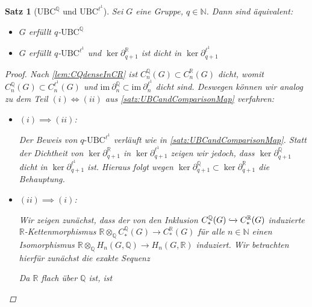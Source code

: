 \documentclass[a4paper,twoside,10pt]{scrreprt}
\newcommand {\img}{\text{im}~}
\newcommand{\N}{\mathbb{N}}
\newcommand{\Q}{\mathbb{Q}}
\newcommand{\R}{\mathbb{R}}
\newtheorem{satz}{Satz}[section]
\theoremstyle{definition}
\begin{document}
\begin{satz}[$\text{UBC}^{\Q}$ und $\text{UBC}^{\ell^1}$]\label{satz:QUBCandComparisonMap}
Sei $G$ eine Gruppe, $q\in \N$. Dann sind äquivalent:
\renewcommand{\labelenumi}{(\roman{enumi}) }
\begin{itemize}
\item $G$ erfüllt $q$-$\text{UBC}^{\Q}$
\item $G$ erfüllt $q$-$\text{UBC}^{\ell^1}$ und $\ker \partial_{q+1}^{\R}$ ist dicht in $\ker \partial_{q+1}^{\ell^1}$
\end{itemize}
\begin{proof}
Nach \cref{lem:CQdenseInCR} ist $C_n^{\Q}(G)\subset C_n^{\R}(G)$ dicht, womit $C_n^{\Q}(G)\subset C_n^{\ell^1}(G)$ und $\img\partial_n^{\Q}\subset \img\partial_n^{\ell^1}$ dicht sind.
Deswegen können wir analog zu dem Teil $(i)\Longleftrightarrow(ii)$ aus \cref{satz:UBCandComparisonMap} verfahren:
\begin{itemize}
\item $(i)\implies (ii)$:\par
Der Beweis von $q\text{-UBC}^{\ell^1}$ verläuft wie in \cref{satz:UBCandComparisonMap}. Statt der Dichtheit von $\ker \partial_{q+1}^{\R}$ in $\ker \partial_{q+1}^{\ell^1}$ zeigen wir jedoch, dass $\ker \partial_{q+1}^{\Q}$ dicht in $\ker \partial_{q+1}^{\ell^1}$ ist. Hieraus folgt wegen $\ker \partial_{q+1}^{\Q}\subset \ker \partial_{q+1}^{\R}$ die Behauptung.
\item $(ii)\implies(i)$:\par
Wir zeigen zunächst, dass der von den Inklusion $C_*^{\Q}(G)\xhookrightarrow{}C_*^{\R}(G)$ induzierte $\R$-Ketten\-morphismus $\R\otimes_{\Q}C_*^{\Q}(G)\to C_*^{\R}(G)$ für alle $n\in\N$ einen Isomorphismus $\R\otimes_{\Q}H_n(G,\Q)\to H_n(G,\R)$ induziert. Wir betrachten hierfür zunächst die exakte Sequenz
\begin{center}
\end{center}
Da $\R$ flach über $\Q$ ist, ist 
\begin{center}
\begin{tikzpicture}

\end{tikzpicture}
\end{center}
\end{itemize}
\end{proof}
\end{satz}
\end{document}
